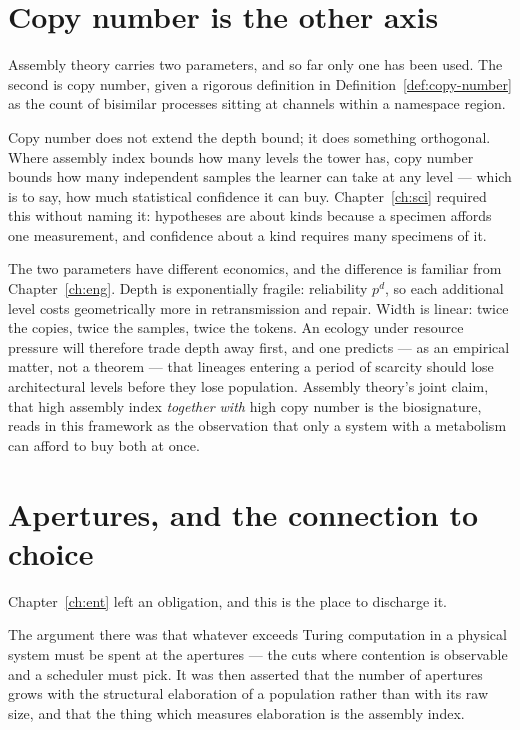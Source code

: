 \section{Copy number is the other axis}

Assembly theory carries two parameters, and so far only one has been
used.
The second is copy number, given a rigorous definition in
Definition~\ref{def:copy-number} as the count of bisimilar processes
sitting at channels within a namespace region.

Copy number does not extend the depth bound; it does something
orthogonal.
Where assembly index bounds how many levels the tower has, copy number
bounds how many independent samples the learner can take at any level ---
which is to say, how much statistical confidence it can buy.
Chapter~\ref{ch:sci} required this without naming it: hypotheses are about
kinds because a specimen affords one measurement, and confidence about a
kind requires many specimens of it.

\begin{remark}
\label{rmk:depth-width}
The two parameters have different economics, and the difference is
familiar from Chapter~\ref{ch:eng}.
Depth is exponentially fragile: reliability $p^d$, so each additional
level costs geometrically more in retransmission and repair.
Width is linear: twice the copies, twice the samples, twice the tokens.
An ecology under resource pressure will therefore trade depth away first,
and one predicts --- as an empirical matter, not a theorem --- that
lineages entering a period of scarcity should lose architectural levels
before they lose population.
Assembly theory's joint claim, that high assembly index \emph{together
with} high copy number is the biosignature, reads in this framework as
the observation that only a system with a metabolism can afford to buy
both at once.
\end{remark}

\section{Apertures, and the connection to choice}

Chapter~\ref{ch:ent} left an obligation, and this is the place to
discharge it.

The argument there was that whatever exceeds Turing computation in a
physical system must be spent at the apertures --- the cuts where
contention is observable and a scheduler must pick.
It was then asserted that the number of apertures grows with the
structural elaboration of a population rather than with its raw size, and
that the thing which measures elaboration is the assembly index.

